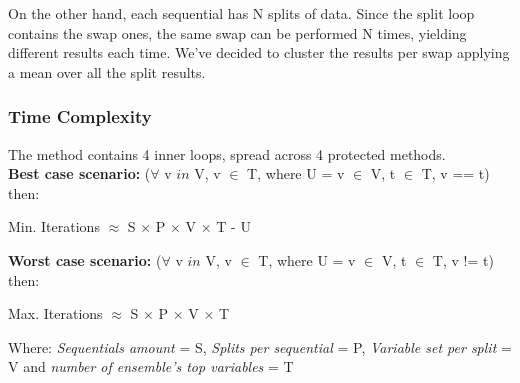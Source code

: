 On the other hand, each sequential has N splits of data. Since the split loop contains the swap ones, the same swap can be performed N times, yielding different results each time. We’ve decided to cluster the results per swap applying a mean over all the split results.

\subsubsection{Time Complexity}
The method contains 4 inner loops, spread across 4 protected methods.
\\

\textbf{Best case scenario:} ($\forall$ v $in$ V, v $\in$ T, where U = v $\in$ V, t $\in$ T, v == t) then:
\begin{center}
Min. Iterations $\approx$ S $\times$ P $\times$ V $\times$ T - U\\    
\end{center}

\textbf{Worst case scenario:} ($\forall$ v $in$ V, v $\in$ T, where U = v $\in$ V, t $\in$ T, v != t) then:
\begin{center}
Max. Iterations $\approx$ S $\times$ P $\times$ V $\times$ T\\    
\end{center}


Where: \textit{Sequentials amount} = S, \textit{Splits per sequential} = P, \textit{Variable set per split} = V and \textit{number of ensemble’s top variables} = T


